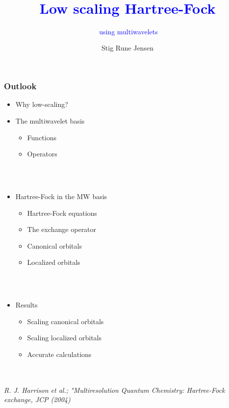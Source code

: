 \documentclass[mathserif]{beamer}
\title{$\;$\\$\;$\\$\;$\\$\;$\\\textcolor{blue}
							{Low scaling Hartree-Fock}}
\subtitle{$\;$\textcolor{blue}
							{using multiwavelets}}
\author{Stig Rune Jensen}
\begin{document}
\footnotesize

{
\maketitle
}

\begin{frame}
	\frametitle{Outlook}
	\begin{itemize}
		\item Why low-scaling?
		\item The multiwavelet basis
		\begin{itemize}
			\scriptsize
			\item Functions
			\item Operators
		\end{itemize}
		\ \\
		\ \\
		\item Hartree-Fock in the MW basis
		\begin{itemize}
			\scriptsize
			\item Hartree-Fock equations
			\item The exchange operator
			\item Canonical orbitals
			\item Localized orbitals
		\end{itemize}
		\ \\
		\ \\
		\item Results
		\begin{itemize}
			\scriptsize
			\item Scaling canonical orbitals
			\item Scaling localized orbitals
			\item Accurate calculations
		\end{itemize}
	\end{itemize}
	\ \\
	\ \\
	\tiny
	\it{R. J. Harrison et al.; "Multiresolution Quantum Chemistry: Hartree-Fock exchange,
		JCP (2004)}
\end{frame}
\end{document}
